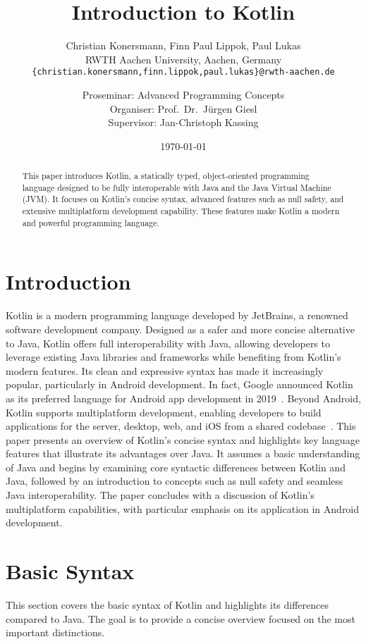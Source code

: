 \documentclass[a4paper,11pt]{article}
\title{\huge \bfseries Introduction to Kotlin}
\author{
  Christian Konersmann, Finn Paul Lippok, Paul Lukas\\[1ex]
  RWTH Aachen University, Aachen, Germany\\
  \texttt{\{christian.konersmann,finn.lippok,paul.lukas\}@rwth-aachen.de}\\
  \and
  Proseminar: Advanced Programming Concepts\\
  Organiser: Prof.\ Dr.\ Jürgen Giesl\\
  Supervisor: Jan-Christoph Kassing
}
\date{\today}
\begin{document}
\maketitle

\begin{abstract}
This paper introduces Kotlin, a statically typed, object-oriented programming language designed to be fully interoperable with Java and the Java Virtual Machine (JVM). It focuses on Kotlin's concise syntax, advanced features such as null safety, and extensive multiplatform development capability. These features make Kotlin a modern and powerful programming language.
\end{abstract}

\section{Introduction}
Kotlin is a modern programming language developed by JetBrains, a renowned software development company. Designed as a safer and more concise alternative to Java, Kotlin offers full interoperability with Java, allowing developers to leverage existing Java libraries and frameworks while benefiting from Kotlin's modern features. Its clean and expressive syntax has made it increasingly popular, particularly in Android development. In fact, Google announced Kotlin as its preferred language for Android app development in 2019~\cite{intro-google}. Beyond Android, Kotlin supports multiplatform development, enabling developers to build applications for the server, desktop, web, and iOS from a shared codebase~\cite{intro-multiplatform-dev}.
This paper presents an overview of Kotlin’s concise syntax and highlights key language features that illustrate its advantages over Java. It assumes a basic understanding of Java and begins by examining core syntactic differences between Kotlin and Java, followed by an introduction to concepts such as null safety and seamless Java interoperability. The paper concludes with a discussion of Kotlin’s multiplatform capabilities, with particular emphasis on its application in Android development.

\section{Basic Syntax}
This section covers the basic syntax of Kotlin and highlights its differences compared to Java. The goal is to provide a concise overview focused on the most important distinctions.
\end{document}

